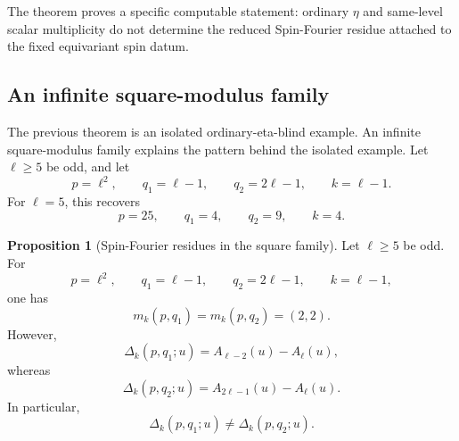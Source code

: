 \documentclass{article}
\theoremstyle{definition}
\newtheorem{proposition}[theorem]{Proposition}
\numberwithin{equation}{section}
\begin{document}
The theorem proves a specific computable statement: ordinary $\eta$ and same-level scalar multiplicity do not determine the reduced Spin-Fourier residue attached to the fixed equivariant spin datum.

\subsection{An infinite square-modulus family}
\label{subsec:check-4-square-family}

The previous theorem is an isolated ordinary-eta-blind example.  An infinite square-modulus family explains the pattern behind the isolated example.  Let $\ell\geq 5$ be odd, and let
\begin{equation}
p=\ell^2,
\qquad
q_1=\ell-1,
\qquad
q_2=2\ell-1,
\qquad
k=\ell-1.
\end{equation}
For $\ell=5$, this recovers
\begin{equation}
p=25,
\qquad
q_1=4,
\qquad
q_2=9,
\qquad
k=4.
\end{equation}

\begin{proposition}[Spin-Fourier residues in the square family]
Let $\ell\geq 5$ be odd.  For
\begin{equation}
p=\ell^2,
\qquad
q_1=\ell-1,
\qquad
q_2=2\ell-1,
\qquad
k=\ell-1,
\end{equation}
one has
\begin{equation}
m_k(p,q_1)=m_k(p,q_2)=(2,2).
\end{equation}
However,
\begin{equation}
\Delta_k(p,q_1;u)=A_{\ell-2}(u)-A_{\ell}(u),
\end{equation}
whereas
\begin{equation}
\Delta_k(p,q_2;u)=A_{2\ell-1}(u)-A_{\ell}(u).
\end{equation}
In particular,
\begin{equation}
\Delta_k(p,q_1;u)\neq \Delta_k(p,q_2;u).
\end{equation}
\end{proposition}
\end{document}
